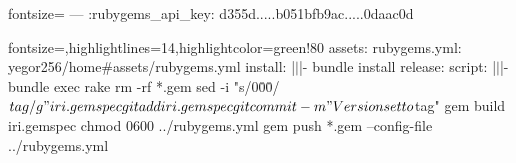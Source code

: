 \documentclass{article}
\begin{document}
\begin{ffcode*}{fontsize=\scriptsize}
---
:rubygems_api_key: d355d.....b051bfb9ac.....0daac0d
\end{ffcode*}
\flush[1]

\begin{ffcode*}{fontsize=\scriptsize,highlightlines={14},highlightcolor=green!80}
assets:
  rubygems.yml: yegor256/home#assets/rubygems.yml
install: |$\vert$|-
  bundle install
release:
  script: |$\vert$|-
    bundle exec rake
    rm -rf *.gem
    sed -i "s/0\.0\.0/${tag}/g" iri.gemspec
    git add iri.gemspec
    git commit -m "Version set to ${tag}"
    gem build iri.gemspec
    chmod 0600 ../rubygems.yml
    gem push *.gem --config-file ../rubygems.yml
\end{ffcode*}
\flush[3]



\end{document}

